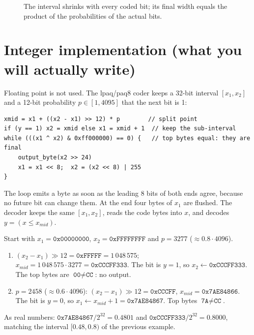 \documentclass[11pt,a4paper,openany]{book}
\theoremstyle{definition}
\theoremstyle{remark}
\begin{document}
\begin{figure}[h]
\centering
{}
\caption{The interval shrinks with every coded bit; its final width equals the product of the probabilities of the actual bits.}
\end{figure}

\section{Integer implementation (what you will actually write)}

Floating point is not used. The lpaq/paq8 coder keeps a 32-bit interval $[x_1,x_2]$ and a 12-bit probability $p\in[1,4095]$ that the next bit is 1:
\begin{lstlisting}[style=pseudo]
xmid = x1 + ((x2 - x1) >> 12) * p        // split point
if (y == 1) x2 = xmid else x1 = xmid + 1  // keep the sub-interval
while (((x1 ^ x2) & 0xff000000) == 0) {   // top bytes equal: they are final
    output_byte(x2 >> 24)
    x1 = x1 << 8;  x2 = (x2 << 8) | 255
}
\end{lstlisting}
The loop emits a byte as soon as the leading 8 bits of both ends agree, because no future bit can change them. At the end four bytes of $x_1$ are flushed. The decoder keeps the same $[x_1,x_2]$, reads the code bytes into $x$, and decodes $y=(x\le x_{mid})$.

\begin{example}
Start with $x_1=\texttt{0x00000000}$, $x_2=\texttt{0xFFFFFFFF}$ and $p=3277$ ($\approx0.8\cdot4096$).
\begin{enumerate}
\item $(x_2-x_1)\gg12=\texttt{0xFFFFF}=1\,048\,575$; $x_{mid}=1\,048\,575\cdot3277=\texttt{0xCCCFF333}$. The bit is $y=1$, so $x_2\leftarrow\texttt{0xCCCFF333}$. The top bytes are $\texttt{00}\ne\texttt{CC}$: no output.
\item $p=2458$ ($\approx0.6\cdot4096$): $(x_2-x_1)\gg12=\texttt{0xCCCFF}$, $x_{mid}=\texttt{0x7AE84866}$. The bit is $y=0$, so $x_1\leftarrow x_{mid}+1=\texttt{0x7AE84867}$. Top bytes $\texttt{7A}\ne\texttt{CC}$.
\end{enumerate}
As real numbers: $\texttt{0x7AE84867}/2^{32}=0.4801$ and $\texttt{0xCCCFF333}/2^{32}=0.8000$, matching the interval $[0.48,0.8)$ of the previous example.
\end{example}
\end{document}
